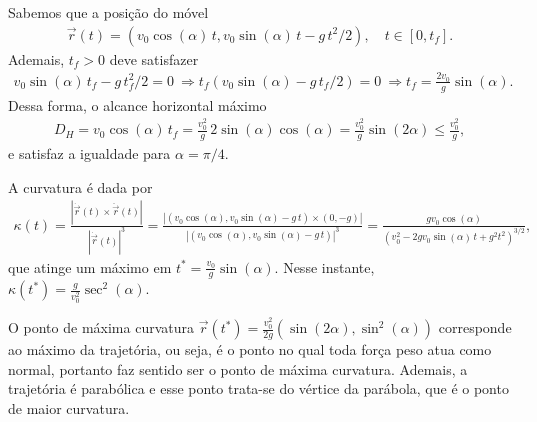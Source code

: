 
\begin{questions}

\setcounter{question}{2}

\begin{solution}
    Sabemos que a posição do móvel
    \begin{align*}
        \vec r(t) = \left( v_0 \cos(\alpha)\,t, v_0 \sin(\alpha)\,t - g\,t^2/2 \right), \quad t \in [0,t_f].
    \end{align*}
    Ademais, $t_f>0$ deve satisfazer
    \begin{align*}
        v_0 \sin(\alpha)\,t_f - g\,t_f^2/2 = 0
            ~\Rightarrow t_f (v_0 \sin(\alpha) - g\,t_f/2) = 0
            ~\Rightarrow t_f = \frac{2 v_0}{g} \sin(\alpha).
    \end{align*}
    Dessa forma, o alcance horizontal máximo
    \begin{align*}
        D_H = v_0 \cos(\alpha)\,t_f =  \frac{v_0^2}{g}\,2 \sin(\alpha)\cos(\alpha)
            = \frac{v_0^2}{g} \sin(2\alpha) \le \frac{v_0^2}{g},
    \end{align*}
    e satisfaz a igualdade para $\alpha = \pi/4$.
    
    A curvatura é dada por
    \begin{align*}
        \kappa(t) 
            = \frac{|\dot{\vec r}(t) \times \ddot{\vec r}(t)|}{|\dot{\vec r}(t)|^3} 
            = \frac{|(v_0 \cos(\alpha),v_0 \sin(\alpha) - g\,t) \times (0,-g)|}{|(v_0 \cos(\alpha),v_0 \sin(\alpha) - g\,t)|^3}
            = \frac{g v_0 \cos(\alpha)}{(v_0^2 - 2 g v_0 \sin(\alpha)\,t+ g^2 t^2 )^{3/2}},
    \end{align*}
    que atinge um máximo em $t^* = \frac{v_0}{g} \sin(\alpha)$. Nesse instante, $\kappa(t^*) = \frac{g}{v_0^2}\sec^2(\alpha)$.
    
    O ponto de máxima curvatura
        $
        \vec r(t^*) = \frac{v_0^2}{2g} \left(\sin(2\alpha), \sin^2(\alpha) \right)
        $
    corresponde ao máximo da trajetória, ou seja, é o ponto no qual toda força peso atua como normal, portanto faz sentido ser o ponto de máxima curvatura.
    Ademais, a trajetória é parabólica e esse ponto trata-se do vértice da parábola, que é o ponto de maior curvatura.
\end{solution}

\end{questions}
